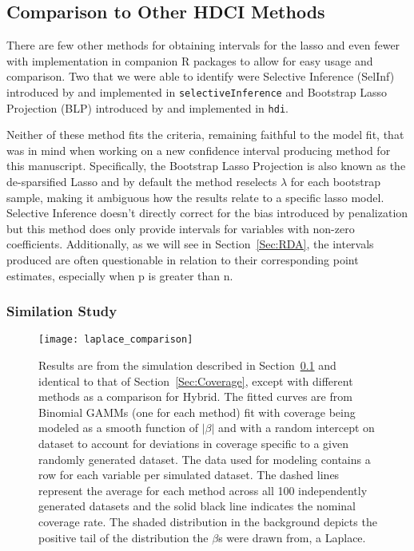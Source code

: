 \subsection{Comparison to Other HDCI Methods}\label{Sec:Comparison}

There are few other methods for obtaining intervals for the lasso and even fewer with implementation in companion R packages to allow for easy usage and comparison. Two that we were able to identify were Selective Inference (SelInf) introduced by \cite{LeeEtAl2016} and implemented in \texttt{selectiveInference} and Bootstrap Lasso Projection (BLP) introduced by \cite{ZhangZhang2014} and implemented in \texttt{hdi}.

Neither of these method fits the criteria, remaining faithful to the model fit, that was in mind when working on a new confidence interval producing method for this manuscript. Specifically, the Bootstrap Lasso Projection is also known as the de-sparsified Lasso and by default the method reselects $\lambda$ for each bootstrap sample, making it ambiguous how the results relate to a specific lasso model. Selective Inference doesn't directly correct for the bias introduced by penalization but this method does only provide intervals for variables with non-zero coefficients. Additionally, as we will see in Section~\ref{Sec:RDA}, the intervals produced are often questionable in relation to their corresponding point estimates, especially when p is greater than n.

\subsubsection{Similation Study}

\begin{figure}[hbtp]
  \texttt{[image: laplace\_comparison]}
  \caption{\label{Fig:laplace_comparison} Results are from the simulation described in Section~\ref{Sec:Comparison} and identical to that of Section~\ref{Sec:Coverage}, except with different methods as a comparison for Hybrid. The fitted curves are from Binomial GAMMs (one for each method) fit with coverage being modeled as a smooth function of $|\beta|$ and with a random intercept on dataset to account for deviations in coverage specific to a given randomly generated dataset. The data used for modeling contains a row for each variable per simulated dataset. The dashed lines represent the average for each method across all 100 independently generated datasets and the solid black line indicates the nominal coverage rate. The shaded distribution in the background depicts the positive tail of the distribution the $\beta$s were drawn from, a Laplace.}
\end{figure}

